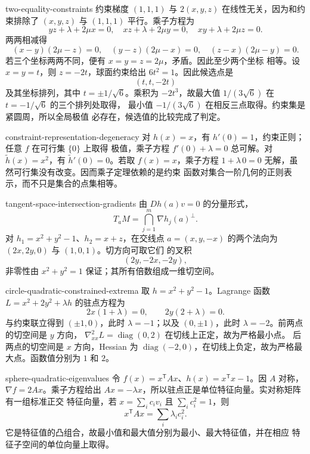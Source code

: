 \begin{solution}{two-equality-constraints}
约束梯度 $(1,1,1)$ 与 $2(x,y,z)$ 在线性无关，因为和约束排除了
$(x,y,z)$ 与 $(1,1,1)$ 平行。乘子方程为
\[
 yz+\lambda+2\mu x=0,\quad
 xz+\lambda+2\mu y=0,\quad
 xy+\lambda+2\mu z=0.
\]
两两相减得
\[
 (x-y)(2\mu-z)=0,\quad
 (y-z)(2\mu-x)=0,\quad
 (z-x)(2\mu-y)=0.
\]
若三个坐标两两不同，便有 \(x=y=z=2\mu\)，矛盾。因此至少两个坐标
相等。设 $x=y=t$，则
$z=-2t$，球面约束给出 $6t^2=1$。因此候选点是
\[
 (t,t,-2t)
\]
及其坐标排列，其中 $t=\pm1/\sqrt6$。乘积为
$-2t^3$，故最大值 $1/(3\sqrt6)$ 在 $t=-1/\sqrt6$ 的三个排列处取得，
最小值 $-1/(3\sqrt6)$ 在相反三点取得。约束集是紧圆周，所以全局极值
必存在，候选值的比较完成了判定。
\end{solution}

\begin{solution}{constraint-representation-degeneracy}
对 $h(x)=x$，有 $h'(0)=1$，约束正则；任意 $f$ 在可行集 $\{0\}$ 上取得
极值，乘子方程 $f'(0)+\lambda=0$ 总可解。对
$\widetilde h(x)=x^2$，有 $\widetilde h'(0)=0$。若取 $f(x)=x$，乘子方程
$1+\lambda\,0=0$ 无解，虽然可行集没有改变。因而乘子定理依赖的是约束
函数对集合一阶几何的正则表示，而不只是集合的点集相等。
\end{solution}

\begin{solution}{tangent-space-intersection-gradients}
由 $Dh(a)v=0$ 的分量形式，
\[
 T_aM=\bigcap_{j=1}^m\nabla h_j(a)^\perp.
\]
对 $h_1=x^2+y^2-1$、$h_2=x+z$，在交线点
$a=(x,y,-x)$ 的两个法向为 $(2x,2y,0)$ 与 $(1,0,1)$。切方向可取它们
的叉积
\[
 (2y,-2x,-2y),
\]
非零性由 $x^2+y^2=1$ 保证；其所有倍数组成一维切空间。
\end{solution}

\begin{solution}{circle-quadratic-constrained-extrema}
取 $h=x^2+y^2-1$。Lagrange 函数
$L=x^2+2y^2+\lambda h$ 的驻点方程为
\[
 2x(1+\lambda)=0,\qquad 2y(2+\lambda)=0.
\]
与约束联立得到 $(\pm1,0)$，此时 $\lambda=-1$；以及 $(0,\pm1)$，此时
$\lambda=-2$。前两点的切空间是 $y$ 方向，
$\nabla^2_{xx}L=\operatorname{diag}(0,2)$ 在切线上正定，故为严格最小点。
后两点的切空间是 $x$ 方向，Hessian 为
$\operatorname{diag}(-2,0)$，在切线上负定，故为严格最大点。函数值分别为
$1$ 和 $2$。
\end{solution}

\begin{solution}{sphere-quadratic-eigenvalues}
令 $f(x)=x^{\mathsf T}Ax$、$h(x)=x^{\mathsf T}x-1$。因 $A$ 对称，
$\nabla f=2Ax$。乘子方程给出
$Ax=-\lambda x$，所以驻点正是单位特征向量。实对称矩阵有一组标准正交
特征向量，若 $x=\sum_i c_iv_i$ 且 $\sum_i c_i^2=1$，则
\[
 x^{\mathsf T}Ax=\sum_i\lambda_i c_i^2.
\]
它是特征值的凸组合，故最小值和最大值分别为最小、最大特征值，并在相应
特征子空间的单位向量上取得。
\end{solution}

